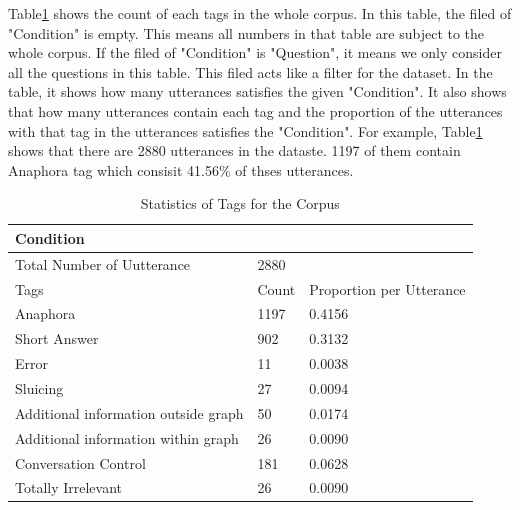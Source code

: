 \documentclass[bsc,frontabs,twoside,singlespacing,parskip,deptreport]{infthesis}     %
\begin{document}
Table\ref{tab:ori} shows the count of each tags in the whole corpus. In this table, the filed of "Condition" is empty. This means all numbers in that table are subject to the whole corpus. If the filed of "Condition" is "Question", it means we only consider all the questions in this table. This filed acts like a filter for the dataset. In the table, it shows how many utterances satisfies the given "Condition". It also shows that how many utterances contain each tag and the proportion of the utterances with that tag in the utterances satisfies the "Condition". For example, Table\ref{tab:ori} shows that there are 2880 utterances in the dataste. 1197 of them contain Anaphora tag which consisit 41.56\% of thses utterances.

\begin{table}[]
\centering
\begin{tabular}{|l|l|l|}
\hline
Condition                            & \multicolumn{2}{l|}{}            \\ \hline
Total Number of Uutterance           & \multicolumn{2}{l|}{2880}        \\ \hline
Tags                                 & Count & Proportion per Utterance \\ \hline
Anaphora                             & 1197  & 0.4156                   \\ \hline
Short Answer                         & 902   & 0.3132                   \\ \hline
Error                                & 11    & 0.0038                   \\ \hline
Sluicing                             & 27    & 0.0094                   \\ \hline
Additional information outside graph & 50    & 0.0174                   \\ \hline
Additional information within graph  & 26    & 0.0090                   \\ \hline
Conversation Control                 & 181   & 0.0628                   \\ \hline
Totally Irrelevant                   & 26    & 0.0090                   \\ \hline
\end{tabular}
\caption{Statistics of Tags for the Corpus }
\label{tab:ori}
\end{table}
\end{document}
